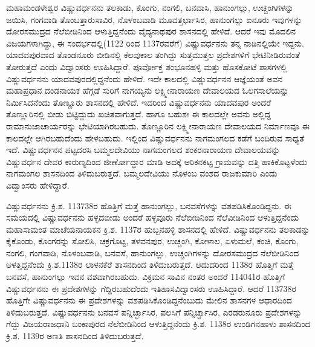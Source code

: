 ಮಹಾಮಂಡಳೇಶ್ವರ ವಿಷ್ಣುವರ್ಧನನು ತಲಕಾಡು, ಕೊಂಗು, ನಂಗಲಿ, ಬನವಾಸಿ, ಹಾನುಂಗಲ್ಲು, ಉಚ್ಚಂಗಿಗಳನ್ನು ಜಯಿಸಿ, ಗಂಗವಾಡಿ ತೊಂಬತ್ತಾರುಸಾವಿರ, ನೊಳಂಬವಾಡಿ ಮೂವತ್ತರ್ಛಾಸಿರ, ಹಾನುಂಗಲ್ಲು ಐನೂರು ಇವುಗಳನ್ನು ದೋರಸಮುದ್ರದ ನೆಲೆಬೀಡಿನಿಂದ ಆಳುತ್ತಿದ್ದನೆಂದು ವೈದ್ಯನಾಥಪುರ ಶಾಸನದಲ್ಲಿ ಹೇಳಿದೆ. ಆದರೆ ಇವು ಮೊದಲಿನ ವಿಜಯಗಳಾಗಿದ್ದು, ಈ ಸಂದರ್ಭದಲ್ಲಿ(1122 ರಿಂದ 1137ರವರೆಗೆ) ವಿಷ್ಣುವರ್ಧನನು ತನ್ನ ನಾಡಿನಲ್ಲಿಯೇ ಇದ್ದನು. ಯಾದವಪುರವಾದ ತೊಂಡನೂರು ಬೀಡಿನಲ್ಲಿ ಕೆಲವುಕಾಲ ತಂಗಿದ್ದು ಸುತ್ತಮುತ್ತಲ ಪ್ರದೇಶಗಳಿಗೆ ಭೇಟಿನೀಡಿರುವಂತೆ ತೋರುತ್ತದೆ ಎಂದು ವಿದ್ವಾಂಸರು ಊಹಿಸಿದ್ದಾರೆ. ಪೂರ್ವೋಕ್ತ ಶಂಭೂನಹಳ್ಳಿ ಮತ್ತು ಹೊಸಕೋಟೆ ಶಾಸಗಳಲ್ಲಿ ವಿಷ್ಣುವರ್ಧನನು ಯಾದವಪುರದಲ್ಲಿದ್ದನೆಂದು ಹೇಳಿದೆ. ಇದೇ ಕಾಲದಲ್ಲಿ ವಿಷ್ಣುವರ್ಧನನ ಆಜ್ಞೆಯಂತೆ ಅವನ ಮಹಾಪ್ರಧಾನ ದಂಡನಾಯಕ ಹೆಗ್ಗಡೆ ಸುರಿಗೆ ನಾಗಯ್ಯನು ಲಕ್ಷ್ಮೀನಾರಾಯಣ ದೇವಾಲಯದ ಓಲಗಸಾಲೆಯನ್ನು ನಿರ್ಮಿಸಿದನೆಂದು ತೊಣ್ಣೂರು ಶಾಸನದಲ್ಲಿ ಹೇಳಿದೆ. ಇದರಿಂದ ವಿಷ್ಣುವರ್ಧನನು ಯಾದವಪುರ ಅಂದರೆ ತೊಣ್ಣೂರಿನಲ್ಲಿ ಬೀಡು ಬಿಟ್ಟಿದ್ದುದು ಖಚಿತವಾಗುತ್ತದೆ. ಹಾಗೂ ಬಹುಶಃ ಈ ಕಾಲದಲ್ಲೇ ಅವನು ಅಲ್ಲಿದ್ದ ರಾಮಾನುಜಾಚಾರ್ಯರನ್ನು ಭೇಟಿಯಾಗಿರಬಹುದು. ತೊಣ್ಣೂರಿನ ಲಕ್ಷ್ಮೀನಾರಾಯಣ ದೇವಾಲಯದ ನಿರ್ಮಾಣವೂ ಈ ಕಾಲದಲ್ಲೇ ಆಗಿರಬಹುದೆಂದು ಹೇಳಬಹುದು. ಇಲ್ಲಿಂದ ವಿಷ್ಣುವರ್ಧನನು ನಾಗಮಂಗಲದ ಕಡೆಗೆ ಬಂದಿರುವ ಸಾಧ್ಯತೆ ಇದೆ. ವಿಷ್ಣುವರ್ಧನನ ಪಟ್ಟದರಸಿ ಬಮ್ಮಲದೇವಿಯು ನಾಗಮಂಗಲದ ಶಂಕರನಾರಾಯಣ ದೇವಾಲಯವನ್ನು ವಿಷ್ಣುವರ್ಧನ ದೇವರ ಕಾರುಣ್ಯದಿಂದ ಜೀರ್ಣೋದ್ಧಾರ ಮಾಡಿ ಅದಕ್ಕೆ ಅರಿಕನಕಟ್ಟ ಗ್ರಾಮವನ್ನು ದತ್ತಿ ಹಾಕಿಕೊಟ್ಟಳೆಂದು ನಾಗಮಂಗಲ ಶಾಸನದಿಂದ ತಿಳಿದುಬರುತ್ತದೆ. ಬಮ್ಮಲದೇವಿಯು ನೊಳಂಬ ವಂಶದ ರಾಜಕುಮಾರಿ ಎಂದು ವಿದ್ವಾಂಸರು ಹೇಳಿದ್ದಾರೆ.

\vskip 3pt

ವಿಷ್ಣುವರ್ಧನನು ಕ್ರಿ.ಶ. 113738ರ ಹೊತ್ತಿಗೆ ಮತ್ತೆ ಹಾನುಂಗಲ್ಲು, ಬನವಸೆಗಳನ್ನು ವಶಪಡಿಸಿಕೊಂಡಿದ್ದನು. ಈ ಸಮಯ\-ದಲ್ಲಿ ವಿಷ್ಣುವರ್ಧನನು ಹಳ್ಳದಬೀಡು ಅಂದರೆ ಹಳ್ಳವೂರು ನೆಲೆಬೀಡಿನಿಂದ ನೆಲೆವೀಡಿನಿಂದ ಆಳುತ್ತಿದ್ದನೆಂದು ಮಹಾಸಾಮಂತ ಮಾಚೆಯನಾಯಕನ ಕ್ರಿ.ಶ. 1137ರ ಹುಬ್ಬನಹಳ್ಳಿ ಶಾಸನದಲ್ಲಿ ಹೇಳಿದೆ. ವಿಷ್ಣುವರ್ಧನನು ತಲಕಾಡನ್ನು ಕೈಕೊಂಡು, ಕೊಂಗರನ್ನು ಸೋಲಿಸಿ, ಚಕ್ರಗೊಟ್ಟ, ತಳವನಪುರ, ಉಚ್ಚಂಗಿ, ಕೋಳಾಲ, ಏಳುಮಲೆ, ಕಂಚಿ, ಕೊಂಗು, ನಂಗಲಿ, ಗಂಗವಾಡಿ, ನೊಳಂಬವಾಡಿ, ಬನವಸೆ, ಹಾನುಂಗಲ್ಲು, ಉಚ್ಚಂಗಿಗಳನ್ನು ದೋರಸಮುದ್ರದ ನೆಲೆಬೀಡಿನಿಂದ ಆಳತ್ತಿದ್ದನೆಂದು ಕ್ರಿ.ಶ.1138ರ ಲಾಳನಕೆರೆ ಶಾಸನದಿಂದ ತಿಳಿದುಬರುತ್ತದೆ. ಆದುದರಿಂದ 1138ರ ಹೊತ್ತಿಗೆ ಮತ್ತೆ ಬನವಸೆ, ಹಾನುಂಗಲ್ಲು ಇವನ ವಶವಾಗಿರಬಹುದು. ವಿಕ್ರಮನ ಸಾವಿನ ನಂತರ ಅಂದರೆ 114041ರ ಹೊತ್ತಿಗೆ ವಿಷ್ಣುವರ್ಧನನು ಈ ಪ್ರದೇಶಗಳನ್ನು ಗೆದ್ದಿರಬಹುದೆಂದು ಇತಿಹಾಸವಿದ್ವಾಂಸರು ಊಹಿಸಿದ್ದಾರೆ. ಆದರೆ 113738ರ ಹೊತ್ತಿಗೇ ವಿಷ್ಣುವರ್ಧನನು ಈ ಪ್ರದೇಶಗಳನ್ನು ವಶಪಡಿಸಿಕೊಂಡಿದ್ದನೆಂಬುದು ಮೇಲಿನ ಶಾಸನಗಳ ಆಧಾರದಿಂದ ತಿಳಿದುಬರುತ್ತದೆ. ವಿಷ್ಣುವರ್ಧನನು ಬನವಸೆ ಪನ್ನಿರ್ಚ್ಛಾಸಿರ, ಪಲಸಿಗೆ ಪನ್ನಿರ್ಚ್ಛಾಸಿರ, ಎರಡರುನೂರು ಪ್ರದೇಶಗಳನ್ನು ಗೆದ್ದು ವಿಜಯರಾಜಧಾನಿ ಬಂಕಾಪುರದ ನೆಲೆಬೀಡಿನಿಂದ ಆಳುತ್ತಿದ್ದ\-ನೆಂದು ಕ್ರಿ.ಶ. 1138ರ ಉಂಡಿಗನಹಾಳು ಶಾಸನದಿಂದ ಕ್ರಿ.ಶ. 1139ರ ಅಣತಿ ಶಾಸನದಿಂದ ತಿಳಿದುಬರುತ್ತದೆ.

